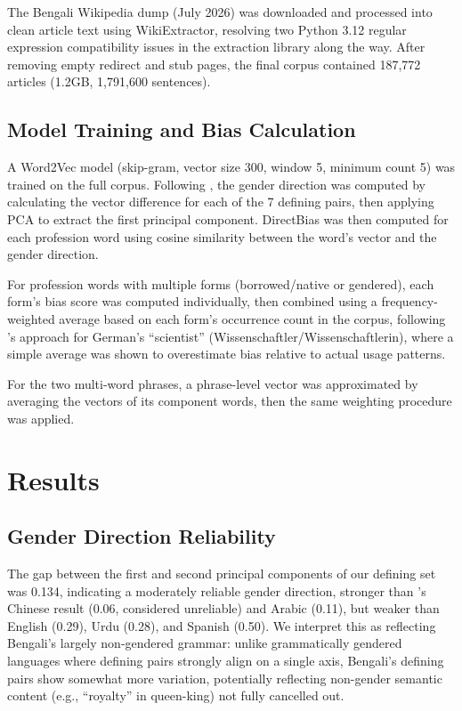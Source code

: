 \documentclass[11pt]{article}
\begin{document}
The Bengali Wikipedia dump (July 2026) was downloaded and processed into clean article text using WikiExtractor, resolving two Python 3.12 regular expression compatibility issues in the extraction library along the way. After removing empty redirect and stub pages, the final corpus contained 187,772 articles (1.2GB, 1,791,600 sentences).

\subsection{Model Training and Bias Calculation}

A Word2Vec model (skip-gram, vector size 300, window 5, minimum count 5) was trained on the full corpus. Following \citet{chen2021gender}, the gender direction was computed by calculating the vector difference for each of the 7 defining pairs, then applying PCA to extract the first principal component. DirectBias \citep{bolukbasi2016man} was then computed for each profession word using cosine similarity between the word's vector and the gender direction.

For profession words with multiple forms (borrowed/native or gendered), each form's bias score was computed individually, then combined using a frequency-weighted average based on each form's occurrence count in the corpus, following \citet{chen2021gender}'s approach for German's ``scientist'' (Wissenschaftler/Wissenschaftlerin), where a simple average was shown to overestimate bias relative to actual usage patterns.

For the two multi-word phrases, a phrase-level vector was approximated by averaging the vectors of its component words, then the same weighting procedure was applied.

\section{Results}

\subsection{Gender Direction Reliability}

The gap between the first and second principal components of our defining set was 0.134, indicating a moderately reliable gender direction, stronger than \citet{chen2021gender}'s Chinese result (0.06, considered unreliable) and Arabic (0.11), but weaker than English (0.29), Urdu (0.28), and Spanish (0.50). We interpret this as reflecting Bengali's largely non-gendered grammar: unlike grammatically gendered languages where defining pairs strongly align on a single axis, Bengali's defining pairs show somewhat more variation, potentially reflecting non-gender semantic content (e.g., ``royalty'' in queen-king) not fully cancelled out.
\end{document}
